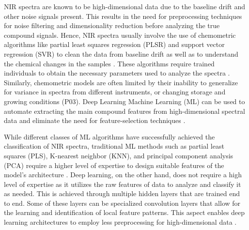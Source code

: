 \documentclass[final, 3p, 11pt]{elsarticle}
\begin{document}
NIR spectra are known to be high-dimensional data due to the baseline drift and other noise signals present. This results in the need for preprocessing techniques for noise filtering and dimensionality reduction before analyzing the true compound signals. Hence, NIR spectra usually involve the use of chemometric algorithms like partial least squares regression (PLSR) and support vector regression (SVR) to clean the data from baseline drift as well as to understand the chemical changes in the samples \citep{shangNIRSpectroscopyCombined2023,naguib2014support}. These algorithms require trained individuals to obtain the necessary parameters used to analyze the spectra \citep{wang2021fcnn}. Similarly, chemometric models are often limited by their inability to generalize for variance in spectra from different instruments, or changing storage and growing conditions (P03). Deep Learning Machine Learning (ML) can be used to automate extracting the main compound features from high-dimensional spectral data and eliminate the need for feature-selection techniques \citep{walsh2023fruit}. 

While different classes of ML algorithms have successfully achieved the classification of NIR spectra, traditional ML methods such as partial least squares (PLS), K-nearest neighbor (KNN), and principal component analysis (PCA) require a higher level of expertise to design suitable features of the model’s architecture \citep{zhangReviewMachineLearning2022}. Deep learning, on the other hand, does not require a high level of expertise as it utilizes the raw features of data to analyze and classify it as needed. This is achieved through multiple hidden layers that are trained end to end. Some of these layers can be specialized convolution layers that allow for the learning and identification of local feature patterns. This aspect enables deep learning architectures to employ less preprocessing for high-dimensional data \citep{yue2021intrusion}. 
\end{document}

